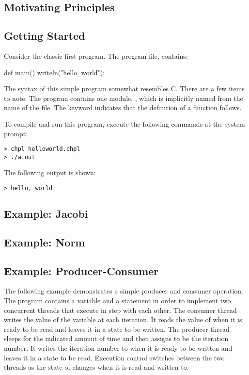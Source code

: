 \label{Language_Overview}

\subsection{Motivating Principles}

\subsection{Getting Started}

Consider the classic first program.  The program file,
 contains:
\begin{chapel}
def main() {
  writeln("hello, world");
}
\end{chapel}

The syntax of this simple program somewhat resembles C.  There are a
few items to note.
The program contains one module, , which is implicitly
named from the name of the file.  The keyword  indicates that the
definition of a function follows.

To compile and run this program, execute the following
commands at the system prompt:
\begin{verbatim} 
> chpl helloworld.chpl
> ./a.out
\end{verbatim}
The following output is shown:
\begin{verbatim}
> hello, world
\end{verbatim}

\subsection{Example: Jacobi}

\subsection{Example: Norm}

\subsection{Example: Producer-Consumer}
The following example demonstrates a simple producer and consumer operation.
The program contains a  variable and a  statement 
in order to implement two concurrent threads that execute in step with each other.
The consumer thread writes the value of the  variable  at 
each iteration.  It reads the value of  when it is ready to be read
and leaves it in a state to be written.  The producer thread sleeps for
the indicated amount of time and then assigns  to be the iteration
number.  It writes the iteration number to  when it is ready to be written
and leaves it in a state to be read.  Execution control switches between the
two threads as the state of  changes when it is read and written to.

